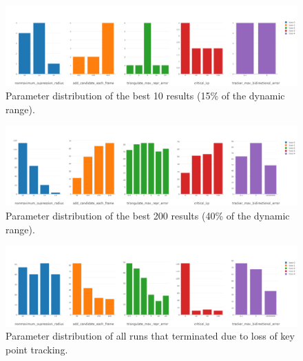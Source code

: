 \begin{figure}[htp]
	\centering
	\includegraphics[width=1\textwidth]{figures/best10}
	\caption{Parameter distribution of the best 10 results  (15\% of the dynamic range).}
	\label{fig:best10}
\end{figure}



\begin{figure}[htp]
	\centering
	\includegraphics[width=1\textwidth]{figures/best200}
	\caption{Parameter distribution of the best 200 results  (40\% of the dynamic range).}
	\label{fig:best200}
\end{figure}



\begin{figure}[htp]
	\centering
	\includegraphics[width=1\textwidth]{figures/exceptions}
	\caption{Parameter distribution of all runs that terminated due to loss of key point tracking. }
	\label{fig:exceptions}
\end{figure}






